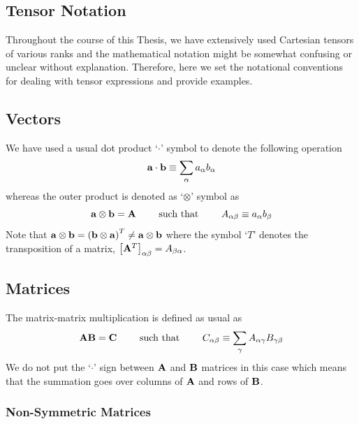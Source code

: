 \documentclass[b5paper,oneside,fleqn,11pt]{book}
\begin{document}
\begin{appendices}

\chapter{Tensor Notation\label{a:tensor-notation}}

Throughout the course of this Thesis, we have extensively used Cartesian tensors
of various ranks and the mathematical notation might be somewhat confusing
or unclear without explanation. Therefore, here we set the notational conventions
for dealing with tensor expressions and provide examples.

\section{Vectors}

We have used a usual dot product `$\cdot$' symbol to denote the following
operation
%
\begin{equation}
 {\bf a} \cdot {\bf b} \equiv \sum_\alpha a_\alpha b_\alpha
\end{equation}
%
whereas the outer product is denoted as `$\otimes$' symbol as
%
\begin{equation}
 {\bf a} \otimes {\bf b} = {\bf A} 
 \qquad\text{ such that } 
 \qquad A_{\alpha\beta}  \equiv a_\alpha b_\beta
\end{equation}
%
Note that ${\bf a} \otimes {\bf b} = \left( {\bf b} \otimes {\bf a} \right)^T \ne 
{\bf a} \otimes {\bf b}$ where the symbol `$T$' denotes the transposition 
of a matrix, $\left[ {\bf A}^T\right]_{\alpha\beta}=A_{\beta\alpha}$.

\section{Matrices}

The matrix\hyp{}matrix multiplication is defined as usual as
%
\begin{equation}
 {\bf A} {\bf B} = {\bf C} 
 \qquad\text{ such that } 
 \qquad C_{\alpha\beta}  \equiv \sum_\gamma A_{\alpha\gamma} B_{\gamma\beta} 
\end{equation}
%
We do not put the `$\cdot$' sign between ${\bf A}$ and ${\bf B}$ matrices 
in this case which means that the summation
goes over columns of ${\bf A}$ and rows of ${\bf B}$.

\subsection{Non-Symmetric Matrices}


\end{appendices}
\end{document}
